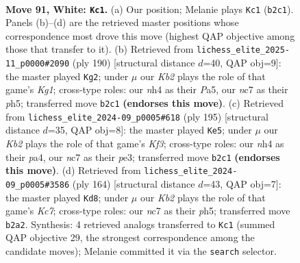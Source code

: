 \documentclass[11pt]{article}
\begin{document}
\clearpage

\begin{figure}[p]\centering
\begin{subfigure}{0.46\textwidth}\centering
\resizebox{\linewidth}{!}{%
\newchessgame
\chessboard[
  setfen={5k2/1Nn5/8/p7/P2pP2n/1P1B3p/1K2P3/4b3 w - - 48 91},
  showmover=false,
  pgfstyle=straightmove, color=movearrow, markmove={b2-c1}
]}
\caption{}
\end{subfigure}\hfill
\begin{subfigure}{0.46\textwidth}\centering
\resizebox{\linewidth}{!}{%
\newchessgame
\chessboard[
  setfen={8/8/1B6/P6p/1k2p1p1/3bP1P1/5P2/6K1 w - - 70 96},
  showmover=false,
  pgfstyle=straightmove, color=movearrow, markmove={g1-g2}
]}
\caption{}
\end{subfigure}
\\[4pt]
\begin{subfigure}{0.46\textwidth}\centering
\resizebox{\linewidth}{!}{%
\newchessgame
\chessboard[
  setfen={8/8/2K2k1p/p1p3p1/Pb4P1/1B2PP2/8/8 b - - 43 98},
  showmover=false,
  pgfstyle=straightmove, color=movearrow, markmove={f6-e5}
]}
\caption{}
\end{subfigure}\hfill
\begin{subfigure}{0.46\textwidth}\centering
\resizebox{\linewidth}{!}{%
\newchessgame
\chessboard[
  setfen={8/2K2k2/p3pB2/P3P2p/1P5P/8/8/5b2 w - - 46 83},
  showmover=false,
  pgfstyle=straightmove, color=movearrow, markmove={c7-d8}
]}
\caption{}
\end{subfigure}
\caption{\textbf{Move 91, White: \texttt{Kc1}.} (a) Our position; Melanie plays \texttt{Kc1} (\texttt{b2c1}). Panels (b)--(d) are the retrieved master positions whose correspondence most drove this move (highest QAP objective among those that transfer to it). (b) Retrieved from \texttt{lichess\_elite\_2025-11\_p0000\#2090} (ply 190) [structural distance $d$=40, QAP obj=9]: the master played \texttt{Kg2}; under $\mu$ our \emph{Kb2} plays the role of that game's \emph{Kg1}; cross-type roles: our \emph{n}h4 as their \emph{P}a5, our \emph{n}c7 as their \emph{p}h5; transferred move \texttt{b2c1} \textbf{(endorses this move)}. (c) Retrieved from \texttt{lichess\_elite\_2024-09\_p0005\#618} (ply 195) [structural distance $d$=35, QAP obj=8]: the master played \texttt{Ke5}; under $\mu$ our \emph{Kb2} plays the role of that game's \emph{Kf3}; cross-type roles: our \emph{n}h4 as their \emph{p}a4, our \emph{n}c7 as their \emph{p}e3; transferred move \texttt{b2c1} \textbf{(endorses this move)}. (d) Retrieved from \texttt{lichess\_elite\_2024-09\_p0005\#3586} (ply 164) [structural distance $d$=43, QAP obj=7]: the master played \texttt{Kd8}; under $\mu$ our \emph{Kb2} plays the role of that game's \emph{Kc7}; cross-type roles: our \emph{n}c7 as their \emph{p}h5; transferred move \texttt{b2a2}. Synthesis: 4 retrieved analogs transferred to \texttt{Kc1} (summed QAP objective 29, the strongest correspondence among the candidate moves); Melanie committed it via the \texttt{search} selector.}
\label{fig:thought-m180}
\end{figure}
\end{document}
